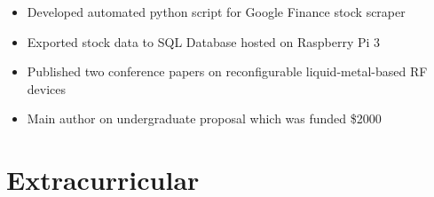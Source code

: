 \documentclass{resume}
\begin{document}
\begin{itemize}[noitemsep, nolistsep]
  \item Developed automated python script for Google Finance stock scraper 
  \item Exported stock data to SQL Database hosted on Raspberry Pi 3
\end{itemize}

\begin{itemize}[noitemsep,nolistsep]
  \item Published two conference papers on reconfigurable liquid-metal-based RF devices
  \item Main author on undergraduate proposal which was funded \$2000
\end{itemize}




\section{%
Extracurricular}
\end{document}
